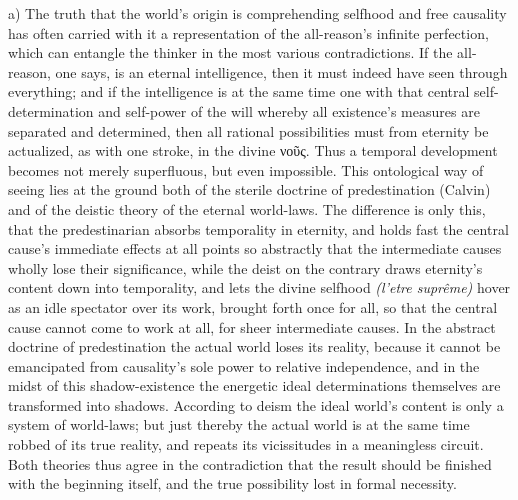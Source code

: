 \documentclass[12pt]{book}
\begin{document}
a) The truth that the world's origin is comprehending selfhood and free
causality has often carried with it a representation of the all-reason's
infinite perfection, which can entangle the thinker in the most various
contradictions. If the all-reason, one says, is an eternal intelligence,
then it must indeed have seen through everything; and if the intelligence is
at the same time one with that central self-determination and self-power of
the will whereby all existence's measures are separated and determined, then
all rational possibilities must from eternity be actualized, as with one
stroke, in the divine νοῦς. Thus a temporal development becomes not merely
superfluous, but even impossible. This ontological way of seeing lies at the
ground both of the sterile doctrine of predestination (Calvin) and of the
deistic theory of the eternal world-laws. The difference is only this, that
the predestinarian absorbs temporality in eternity, and holds fast the
central cause's immediate effects at all points so abstractly that the
intermediate causes wholly lose their significance, while the deist on the
contrary draws eternity's content down into temporality, and lets the divine
selfhood \textit{(l'etre suprême)} hover as an idle spectator over its work,
brought forth once for all, so that the central cause cannot come to work at
all, for sheer intermediate causes. In the abstract doctrine of
predestination the actual world loses its reality, because it cannot be
emancipated from causality's sole power to relative independence, and in the
midst of this shadow-existence the energetic ideal determinations themselves
are transformed into shadows. According to deism the ideal world's content
is only a system of world-laws; but just thereby the actual world is at the
same time robbed of its true reality, and repeats its vicissitudes in a
meaningless circuit. Both theories thus agree in the contradiction that the
result should be finished with the beginning itself, and the true
possibility lost in formal necessity.
\end{document}
